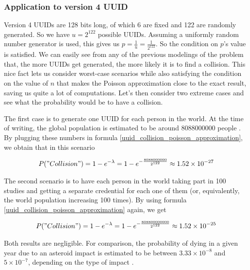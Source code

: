 \documentclass{report}
\begin{document}
\subsubsection{Application to version 4 UUID}
Version 4 UUIDs are 128 bits long, of which 6 are fixed and 122 are randomly generated. So we have $u=2^{122}$ possible UUIDs. Assuming a uniformly random number generator is used, this gives us
$p=\frac{1}{u}=\frac{1}{2^{122}}$. So the condition on $p$'s value is satisfied. We can easily see from any of the previous modelings of the problem that, the more UUIDs get generated, the more likely it is to find a
collision. This nice fact lets us consider worst-case scenarios while also satisfying the condition on the value of $n$ that makes the Poisson approximation close to the exact result,
saving us quite a lot of computations. Let's then consider two extreme cases and see what the probability would be to have a collision. \par
The first case is to generate one UUID for each person in the world. At the time of writing, the global population is estimated to be around \num{8088000000} people
\cite{world-population}. By plugging these numbers in formula \ref{uuid_collision_poisson_approximation}, we obtain that in this scenario

	$$P("Collision")=1-e^{-\lambda}=1-e^{-\frac{8088000000}{2^{122}}} \approx 1.52 \times 10^{-27}$$

The second scenario is to have each person in the world taking part in 100 studies and getting a separate credential for each one of them (or, equivalently, the world population
increasing 100 times). By using formula
\ref{uuid_collision_poisson_approximation} again, we get

$$P("Collision")=1-e^{-\lambda}=1-e^{-\frac{808800000000}{2^{122}}} \approx 1.52 \times 10^{-25}$$ 

Both results are negligible. For comparison, the probability of dying in a given year due to an asteroid impact is estimated to be between $3.33 \times 10^{-8}$ and $5 \times
10^{-7}$, depending on the type of impact \cite{death-by-asteroid}.
\end{document}
